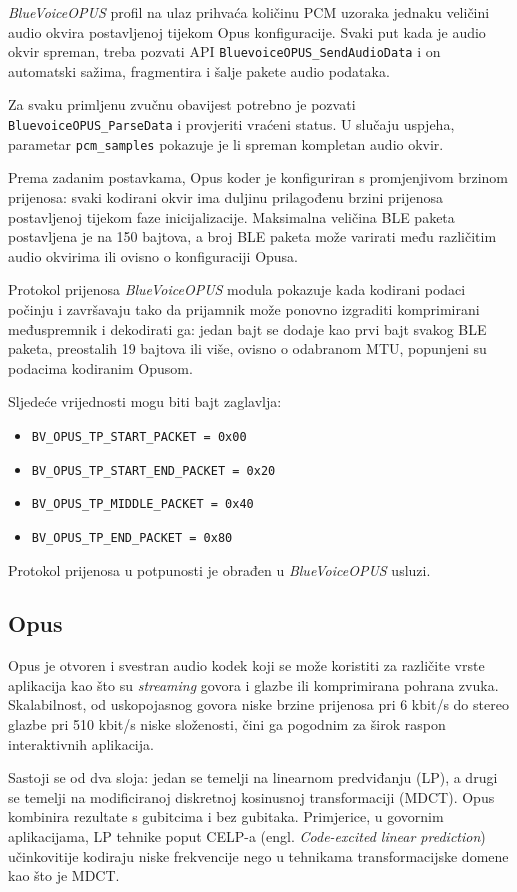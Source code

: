 \textit{BlueVoiceOPUS} profil na ulaz prihvaća količinu PCM uzoraka jednaku veličini audio okvira postavljenoj tijekom Opus konfiguracije. Svaki put kada je audio okvir spreman, treba pozvati API \lstinline|BluevoiceOPUS_SendAudioData| i on automatski sažima, fragmentira i šalje pakete audio podataka.

Za svaku primljenu zvučnu obavijest potrebno je pozvati \lstinline|BluevoiceOPUS_ParseData| i provjeriti vraćeni status. U slučaju uspjeha, parametar \lstinline|pcm_samples| pokazuje je li spreman kompletan audio okvir.

Prema zadanim postavkama, Opus koder je konfiguriran s promjenjivom brzinom prijenosa: svaki kodirani okvir ima  duljinu prilagođenu brzini prijenosa postavljenoj tijekom faze inicijalizacije. Maksimalna veličina BLE paketa postavljena je na 150 bajtova, a broj BLE paketa može varirati među različitim audio okvirima ili ovisno o konfiguraciji Opusa.

Protokol prijenosa \textit{BlueVoiceOPUS} modula pokazuje kada kodirani podaci počinju i završavaju tako da prijamnik može ponovno izgraditi komprimirani međuspremnik i dekodirati ga: jedan bajt se dodaje kao prvi bajt svakog BLE paketa, preostalih 19 bajtova ili više, ovisno o odabranom MTU, popunjeni su podacima kodiranim Opusom.

Sljedeće vrijednosti mogu biti bajt zaglavlja:
\begin{itemize}
	\item \lstinline|BV_OPUS_TP_START_PACKET = 0x00|
	\item \lstinline|BV_OPUS_TP_START_END_PACKET = 0x20|
	\item \lstinline|BV_OPUS_TP_MIDDLE_PACKET = 0x40|
	\item \lstinline|BV_OPUS_TP_END_PACKET = 0x80|
\end{itemize}

Protokol prijenosa u potpunosti je obrađen u \textit{BlueVoiceOPUS} usluzi.
\subsection{Opus}
Opus je otvoren i svestran audio kodek koji se može koristiti za različite vrste aplikacija kao što su \textit{streaming} govora i glazbe ili komprimirana pohrana zvuka. Skalabilnost, od uskopojasnog govora niske brzine prijenosa pri 6 kbit/s do stereo glazbe pri 510 kbit/s niske složenosti, čini ga pogodnim za širok raspon interaktivnih aplikacija.

Sastoji se od dva sloja: jedan se temelji na linearnom predviđanju (LP), a drugi se temelji na modificiranoj diskretnoj kosinusnoj transformaciji (MDCT). Opus kombinira rezultate s gubitcima i bez gubitaka. Primjerice, u govornim aplikacijama, LP tehnike poput CELP-a (engl. \textit{Code-excited linear prediction}) učinkovitije kodiraju niske frekvencije nego u tehnikama transformacijske domene kao što je MDCT.

